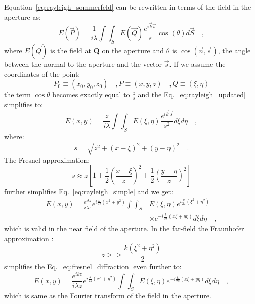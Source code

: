 Equation~\eqref{eq:rayleigh_sommerfeld} can be rewritten in terms of the field in the aperture as:
\begin{equation}
\label{eq:rayleigh_updated}
E(\vec{P}) = \frac{1}{i\lambda}\int \int _S E(\vec{Q}) \frac{e^{i\vec{k}\vec{s}}}{s} \cos (\theta) d\vec{S} \quad ,
\end{equation}
where $E(\vec{Q})$ is the field at \textbf{Q} on the aperture and $\theta$ is $\cos (\vec{n},\vec{s})$, the angle between the normal to the aperture and the vector $\vec{s}$. If we assume the coordinates of the point:
\begin{subequations}
\begin{equation}
P_0 \equiv \left(x_0, y_0, z_0\right) \quad ,
\end{equation}
\begin{equation}
P \equiv \left(x, y, z\right) \quad ,
\end{equation}
\begin{equation}
Q \equiv \left( \xi , \eta \right) 
\end{equation}
\end{subequations}
the term $\cos \theta$ becomes exactly equal to $\frac{z}{s}$ and the Eq.~\eqref{eq:rayleigh_updated} simplifies to:
\begin{equation}
\label{eq:rayleigh_simple}
E\left( x,y\right) = \frac{z}{i\lambda}\int \int _S E(\xi,\eta) \frac{e^{i\vec{k}\vec{s}}}{s^2} d\xi d\eta \quad ,
\end{equation}
where:
\begin{equation}
s = \sqrt{z^2 + \left( x - \xi \right) ^2 + \left( y-\eta \right) ^2} \quad .
\end{equation}
The Fresnel approximation:
\begin{equation}
\label{eq:fresnel_approx}
s \approx z\left[ 1 + \frac{1}{2}\left(\frac{x-\xi}{z}\right)^2 + \frac{1}{2}\left(\frac{y-\eta}{z}\right)^2\right]
\end{equation}
further simplifies Eq.~\eqref{eq:rayleigh_simple} and we get:
\begin{equation}
\label{eq:fresnel_diffraction}
\begin{split}
E\left( x,y\right) = \frac{e^{ikz}}{i\lambda z}e^{i\frac{k}{2z}(x^2+y^2)}\int \int _{S} & E\left( \xi , \eta \right) e^{i\frac{k}{2z}(\xi^2+\eta ^2)} \\
& \times e^{-i\frac{k}{2z}(x\xi+y\eta)} d\xi d\eta \quad ,
\end{split}
\end{equation}
which is valid in the near field of the aperture. In the far-field the Fraunhofer approximation \cite{goodmanfourier}:
\begin{equation}
\label{eq:fraunhofer_approx}
z >> \frac{k\left( \xi ^2 + \eta ^2\right)}{2}
\end{equation}
simplifies the Eq.~\eqref{eq:fresnel_diffraction} even further to:
\begin{equation}
\label{eq:fraunhofer_diffraction}
E\left( x,y\right) = \frac{e^{ikz}}{i\lambda z}e^{i\frac{k}{2z}(x^2+y^2)}\int \int _{S}  E \left( \xi , \eta \right) e^{-i\frac{k}{2z}(x\xi+y\eta )} d\xi d\eta \quad ,
\end{equation}
which is same as the Fourier transform of the field in the aperture.


